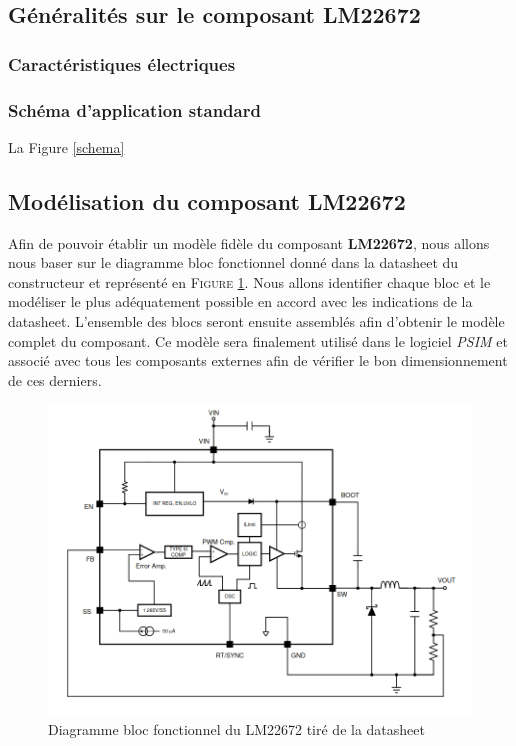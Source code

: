 \documentclass[a4paper,12pt]{book}
\begin{document}
			\subsection{Généralités sur le composant LM22672}
			
				\subsubsection{Caractéristiques électriques}
			
				\subsubsection{Schéma d'application standard}
				
				La Figure \ref{schema}
				
			\subsection{Modélisation du composant LM22672}
			
				Afin de pouvoir établir un modèle fidèle du composant \textbf{LM22672}, nous allons nous baser sur le diagramme bloc fonctionnel donné dans la datasheet du constructeur et représenté en \textsc{Figure \ref{func_bloc_lm22672}}. Nous allons identifier chaque bloc et le modéliser le plus adéquatement possible en accord avec les indications de la datasheet. L'ensemble des blocs seront ensuite assemblés afin d'obtenir le modèle complet du composant. Ce modèle sera finalement utilisé dans le logiciel \textit{PSIM} et associé avec tous les composants externes afin de vérifier le bon dimensionnement de ces derniers.
				
				\begin{figure}[h]
					\begin{center}
						\includegraphics[scale=0.5]{../Illus/func_bloc_lm22672.png}
					\end{center}
					\caption{Diagramme bloc fonctionnel du LM22672 tiré de la datasheet \cite{LM22672}}
					\label{func_bloc_lm22672}
				\end{figure}
				
\end{document}
